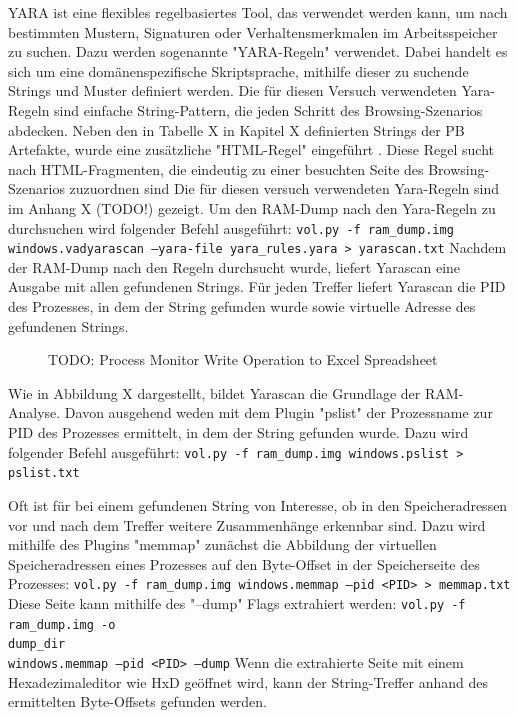 YARA ist eine flexibles regelbasiertes Tool, das verwendet werden kann, um nach bestimmten Mustern, Signaturen oder Verhaltensmerkmalen im Arbeitsspeicher zu suchen. Dazu werden sogenannte "YARA-Regeln" verwendet. Dabei handelt es sich um eine domänenspezifische Skriptsprache, mithilfe dieser zu suchende Strings und Muster definiert werden.
Die für diesen Versuch verwendeten Yara-Regeln sind einfache String-Pattern, die jeden Schritt des Browsing-Szenarios abdecken. 
Neben den in Tabelle X in Kapitel X definierten Strings der PB Artefakte, wurde eine zusätzliche "HTML-Regel" eingeführt \cite{Said.2011}. Diese Regel sucht nach HTML-Fragmenten, die eindeutig zu einer besuchten Seite des Browsing-Szenarios zuzuordnen sind
Die für diesen versuch verwendeten Yara-Regeln sind im Anhang X (TODO!) gezeigt.
Um den RAM-Dump nach den Yara-Regeln zu durchsuchen wird folgender Befehl ausgeführt: \texttt{vol.py -f ram\_dump.img windows.vadyarascan --yara-file yara\_rules.yara > yarascan.txt}
Nachdem der RAM-Dump nach den Regeln durchsucht wurde, liefert Yarascan eine Ausgabe mit allen gefundenen Strings.
Für jeden Treffer liefert Yarascan die PID des Prozesses, in dem der String gefunden wurde sowie virtuelle Adresse des gefundenen Strings.

\begin{figure}[h!]
	\centering
	\small
	\centerline{\resizebox{\linewidth}{!}{}}
	\caption{TODO: Process Monitor Write Operation to Excel Spreadsheet}
	\label{fig:jes}
\end{figure}
Wie in Abbildung X dargestellt, bildet Yarascan die Grundlage der RAM-Analyse.
Davon ausgehend weden mit dem Plugin "pslist" der Prozessname zur PID des Prozesses ermittelt, in dem der String gefunden wurde. Dazu wird folgender Befehl ausgeführt: \texttt{vol.py -f ram\_dump.img windows.pslist > pslist.txt}

Oft ist für bei einem gefundenen String von Interesse, ob in den Speicheradressen vor und nach dem Treffer weitere Zusammenhänge erkennbar sind.
Dazu wird mithilfe des Plugins "memmap" zunächst die Abbildung der virtuellen Speicheradressen eines Prozesses auf den Byte-Offset in der Speicherseite des Prozesses:
\texttt{vol.py -f ram\_dump.img windows.memmap --pid <PID> > memmap.txt}
Diese Seite kann mithilfe des "--dump" Flags extrahiert werden: \texttt{vol.py -f ram\_dump.img -o \\dump\_dir\\ windows.memmap --pid <PID> --dump}
Wenn die extrahierte Seite mit einem Hexadezimaleditor wie HxD geöffnet wird, kann der String-Treffer anhand des ermittelten Byte-Offsets gefunden werden.


